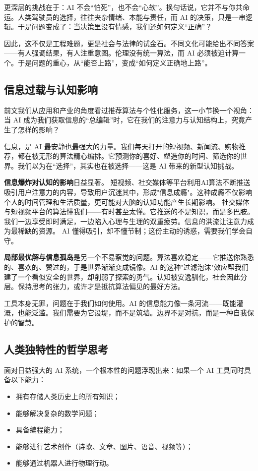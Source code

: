 更深层的挑战在于：AI 不会“怕死”，也不会“心软”。换句话说，它并不与你共命运。人类驾驶员的选择，往往夹杂情绪、本能与责任，而 AI 的决策，只是一串逻辑。于是问题变成了：当决策里没有情感，我们还如何定义“正确”？

因此，这不仅是工程难题，更是社会与法律的试金石。不同文化可能给出不同答案——有人强调结果，有人注重意图。伦理没有统一算法，而 AI 必须被迫计算一个。于是问题的重心，从“能否上路”，变成“如何定义正确地上路”。

\subsection{信息过载与认知影响}
前文我们从应用和产业的角度看过推荐算法与个性化服务，这一小节换一个视角：当 AI 成为我们获取信息的“总编辑”时，它在我们的注意力与认知结构上，究竟产生了怎样的影响？

信息，是 AI 最安静也最强大的力量。我们每天打开的短视频、新闻流、购物推荐，都在被无形的算法精心编排。它预测你的喜好、塑造你的时间、筛选你的世界。我们以为在“选择”，其实也在被选择——这是 AI 带来的新型认知挑战。

{\bf 信息爆炸对认知的影响}日益显著。
短视频、社交媒体等平台利用AI算法不断推送吸引用户注意力的内容，导致用户沉迷其中，形成"信息成瘾"。这种成瘾不仅影响个人的时间管理和生活质量，更可能对大脑的认知功能产生长期影响。
%
社交媒体与短视频平台的算法懂我们——有时甚至太懂。它推送的不是知识，而是多巴胺。我们一边享受即时满足，一边陷入心理与生理的双重疲劳。信息的洪流让注意力成为最稀缺的资源。 AI 懂得吸引，却不懂节制；这份主动的诱惑，需要我们学会自守。

{\bf 局部最优解与信息孤岛}是另一个不易察觉的问题。算法喜欢稳定——它推送你熟悉的、喜欢的、赞过的，于是世界渐渐变成镜像。AI 的这种"过滤泡沫"效应帮我们建了一个看似安全的世界，却削弱了探索的勇气。认知被安逸驯化，社会因此分层。保持思考的张力，或许才是抵抗算法偏见的最好方法。

工具本身无罪，问题在于我们如何使用。AI 的信息能力像一条河流——既能灌溉，也能泛滥。我们需要为它设堤，而不是筑墙。边界不是对抗，而是一种自我保护的智慧。

\subsection{人类独特性的哲学思考}

面对日益强大的 AI 系统，一个根本性的问题浮现出来：如果一个 AI 工具同时具备以下能力：

\begin{itemize}
\item 拥有存储人类历史上的所有知识；
\item 能够解决复杂的数学问题；
\item 具备编程能力；
\item 能够进行艺术创作（诗歌、文章、图片、语音、视频等）；
\item 能够通过机器人进行物理行动。
\end{itemize}


